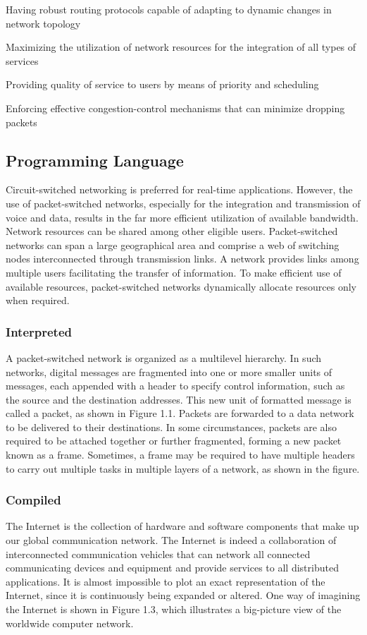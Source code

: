 Having robust routing protocols capable of adapting to dynamic changes in network topology

Maximizing the utilization of network resources for the integration of all types of services

Providing quality of service to users by means of priority and scheduling

Enforcing effective congestion-control mechanisms that can minimize dropping packets


\subsection{Programming Language}
Circuit-switched networking is preferred for real-time applications. However, the use of packet-switched networks, especially for the integration and transmission of voice and data, results in the far more efficient utilization of available bandwidth. Network resources can be shared among other eligible users. Packet-switched networks can span a large geographical area and comprise a web of switching nodes interconnected through transmission links. A network provides links among multiple users facilitating the transfer of information. To make efficient use of available resources, packet-switched networks dynamically allocate resources only when required.


\subsubsection{Interpreted}
A packet-switched network is organized as a multilevel hierarchy. In such networks, digital messages are fragmented into one or more smaller units of messages, each appended with a header to specify control information, such as the source and the destination addresses. This new unit of formatted message is called a packet, as shown in Figure 1.1. Packets are forwarded to a data network to be delivered to their destinations. In some circumstances, packets are also required to be attached together or further fragmented, forming a new packet known as a frame. Sometimes, a frame may be required to have multiple headers to carry out multiple tasks in multiple layers of a network, as shown in the figure.


\subsubsection{Compiled}
The Internet is the collection of hardware and software components that make up our global communication network. The Internet is indeed a collaboration of interconnected communication vehicles that can network all connected communicating devices and equipment and provide services to all distributed applications. It is almost impossible to plot an exact representation of the Internet, since it is continuously being expanded or altered. One way of imagining the Internet is shown in Figure 1.3, which illustrates a big-picture view of the worldwide computer network.


